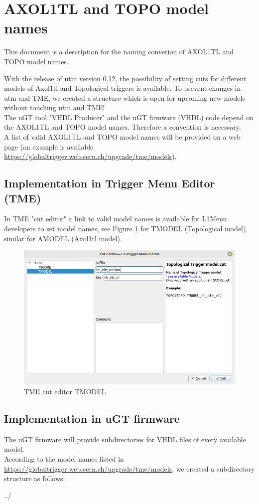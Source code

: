 
\section{AXOL1TL and TOPO model names}

This document is a description for the naming convetion of AXOL1TL and TOPO model names.

With the release of utm version 0.12, the possibility of setting cuts for different models of Axol1tl and Topological triggers is available.
To prevent changes in utm and TME, we created a structure which is open for upcoming new models without touching utm and TME!\\
The uGT tool "VHDL Producer" and the uGT firmware (VHDL) code depend on the AXOL1TL and TOPO model names. Therefore a convention is necessary.\\
A list of valid AXOL1TL and TOPO model names will be provided on a web page (an example is available \url{https://globaltrigger.web.cern.ch/upgrade/tme/models}).

\subsection{Implementation in Trigger Menu Editor (TME)}

In TME "cut editor" a link to valid model names is available for L1Menu developers to set model names, see Figure \ref{fig:tme_model_cut} for TMODEL (Topological model),
similar for AMODEL (Axol1tl model).

\begin{figure}[htb]
\centering
\includegraphics[width=15cm]{figures/tme_model_cut}
\caption{TME cut editor TMODEL}
\label{fig:tme_model_cut}
\end{figure}

\subsection{Implementation in uGT firmware}

The uGT firmware will provide subdirectories for VHDL files of every available model.\\
According to the model names listed in \url{https://globaltrigger.web.cern.ch/upgrade/tme/models}, we created a subdirectory structure as follows:

../
